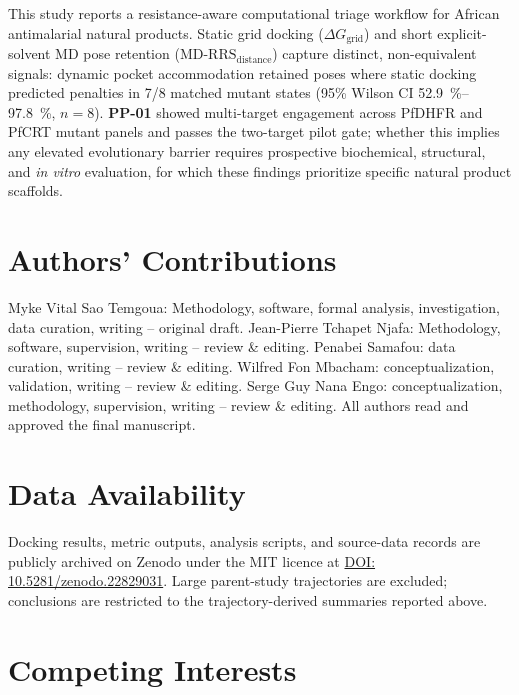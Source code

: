 \documentclass[journal=jcisd8,manuscript=article,layout=traditional]{achemso}
\begin{document}
This study reports a resistance-aware computational triage workflow for African antimalarial natural products. Static grid docking ($\Delta G_{\mathrm{grid}}$) and short explicit-solvent MD pose retention ($\mathrm{MD\text{-}RRS}_{\mathrm{distance}}$) capture distinct, non-equivalent signals: dynamic pocket accommodation retained poses where static docking predicted penalties in 7/8 matched mutant states (95\% Wilson CI \qtyrange{52.9}{97.8}{\percent}, $n=\num{8}$). \textbf{PP-01} showed multi-target engagement across PfDHFR and PfCRT mutant panels and passes the two-target pilot gate; whether this implies any elevated evolutionary barrier requires prospective biochemical, structural, and \textit{in vitro} evaluation, for which these findings prioritize specific natural product scaffolds.


\section*{Authors' Contributions}

Myke Vital Sao Temgoua: Methodology, software, formal analysis, investigation, data curation, writing -- original draft. Jean-Pierre Tchapet Njafa: Methodology, software, supervision, writing -- review \& editing. Penabei Samafou: data curation, writing -- review \& editing. Wilfred Fon Mbacham: conceptualization, validation, writing -- review \& editing. Serge Guy Nana Engo: conceptualization, methodology, supervision, writing -- review \& editing. All authors read and approved the final manuscript.

\section*{Data Availability}

Docking results, metric outputs, analysis scripts, and source-data records are publicly archived on Zenodo under the MIT licence at \href{https://doi.org/10.5281/zenodo.22829031}{DOI: 10.5281/zenodo.22829031}. Large parent-study trajectories are excluded; conclusions are restricted to the trajectory-derived summaries reported above.


\section*{Competing Interests}
\end{document}
